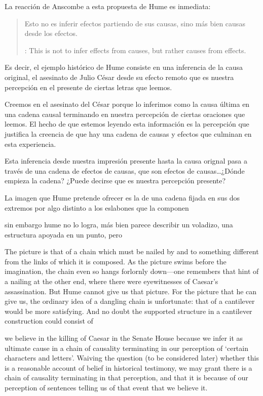 La reacción de Anscombe a esta propuesta de Hume es inmediata:
\blockquote[{\cite[86]{anscombe1981hjc}}: This is not to infer effects from
causes, but rather causes from effects.]{Esto no es inferir efectos partiendo de
  sus causas, sino más bien causas desde los efectos.} Es decir, el ejemplo
histórico de Hume consiste en una inferencia de la causa original, el asesinato
de Julio César desde su efecto remoto que es nuestra percepción en el presente
de ciertas letras que leemos.

Creemos en el asesinato del César porque lo inferimos como la causa última en
una cadena causal terminando en nuestra percepción de ciertas oraciones que
leemos. El hecho de que estemos leyendo esta información es la percepción que
justifica la creencia de que hay una cadena de causas y efectos que culminan en
esta experiencia.


Esta inferencia desde nuestra impresión presente
hasta la causa orignal pasa a través de una cadena de efectos de causas, que son
efectos de causas\ldots ¿Dónde empieza la cadena? ¿Puede decirse que es nuestra
percepción presente?

La imagen que Hume pretende ofrecer es la de una cadena fijada en sus dos
extremos por algo distinto a los eslabones que la componen

sin embargo hume no lo logra, más bien parece describir un voladizo, una
estructura apoyada en un punto, pero


The picture is that of a chain which must be nailed by and to something
different from the links of which it is composed. As the picture swims before
the imagination, the chain even so hangs forlornly down—one remembers that hint
of a nailing at the other end, where there were eyewitnesses of Caesar’s
assassination. But Hume cannot give us that picture. For the picture that he can
give us, the ordinary idea of a dangling chain is unfortunate: that of a
cantilever would be more satisfying. And no doubt the supported structure in a
cantilever construction could consist of


we believe in the killing of Caesar in the Senate House because we infer it as
ultimate cause in a chain of causality terminating in our perception of ‘certain
characters and letters’. Waiving the question (to be considered later) whether
this is a reasonable account of belief in historical testimony, we may grant
there is a chain of causality terminating in that perception, and that it is
because of our perception of sentences telling us of that event that we believe
it.


